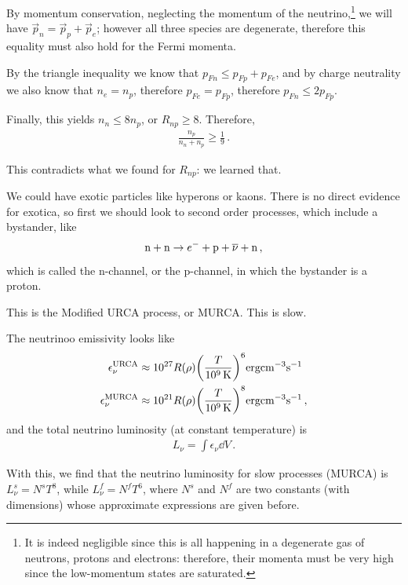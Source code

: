 \documentclass[main.tex]{subfiles}
\begin{document}
By momentum conservation, neglecting the momentum of the neutrino,\footnote{It is indeed negligible since this is all happening in a degenerate gas of neutrons, protons and electrons: therefore, their momenta must be very high since the low-momentum states are saturated.} we will have \(\vec{p}_n = \vec{p}_p + \vec{p}_e\); however all three species are degenerate, therefore this equality must also hold for the Fermi momenta. 

By the triangle inequality we know that \(p_{Fn} \leq p_{Fp} + p_{Fe}\), and by charge neutrality we also know that \(n_e = n_p\), therefore  \(p_{Fe} = p_{Fp}\), therefore \(p_{Fn} \leq 2 p_{Fp}\). 

Finally, this yields \(n_n \leq 8 n_p\), or \(R_{np} \geq 8\). Therefore, 
%
\begin{align}
\frac{n_p}{n_n + n_p} \geq \frac{1}{9}
\,.
\end{align}

This contradicts what we found for \(R_{np}\): we learned that. 

We could have exotic particles like hyperons or kaons.
There is no direct evidence for exotica, so first we should look to second order processes, which include a bystander, like
%
\begin{align}
\ce{n} + \ce{n} \to e^{-} + \ce{p} + \overline{\nu} + \ce{n}
\,,
\end{align}
%
which is called the n-channel, or the p-channel, in which the bystander is a proton. 

This is the Modified URCA process, or MURCA. This is slow. 

The neutrinoo emissivity looks like 
%
\begin{align}
\epsilon _\nu^{\text{URCA}} &\approx \num{e27} R(\rho ) \qty(\frac{T}{\SI{e9}{K}})^{6} \SI{}{erg cm^{-3} s^{-1}} \\
\epsilon _\nu^{\text{MURCA}} &\approx \num{e21} R(\rho ) \qty(\frac{T}{\SI{e9}{K}})^{8} \SI{}{erg cm^{-3} s^{-1}}
\,,
\end{align}
%
and the total neutrino luminosity (at constant temperature) is 
%
\begin{align}
L_\nu = \int \epsilon _\nu \dd{V}
\,.
\end{align}

With this, we find that the neutrino luminosity for slow processes (MURCA) is \(L_\nu^{s} = N^{s} T^{8}\), while \(L_\nu^{f} = N^{f} T^{6}\), where \(N^{s}\) and \(N^{f}\) are two constants (with dimensions) whose approximate expressions are given before. 
\end{document}

